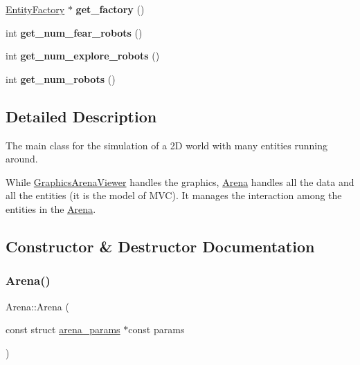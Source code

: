 \begin{DoxyCompactItemize}
\mbox{\label{class_arena_a684050e2bd1c7a6ecb57c38575fec995}} 
\mbox{\hyperlink{class_entity_factory}{Entity\+Factory}} $\ast$ {\bfseries get\+\_\+factory} ()
\item 
\mbox{\label{class_arena_abc2f835afc51723b80fb53310e6c4864}} 
int {\bfseries get\+\_\+num\+\_\+fear\+\_\+robots} ()
\item 
\mbox{\label{class_arena_a8fdca5473b8a8795a241f2a7ade172c2}} 
int {\bfseries get\+\_\+num\+\_\+explore\+\_\+robots} ()
\item 
\mbox{\label{class_arena_a0b6b09dbeb919c2300dc034a39cbe57f}} 
int {\bfseries get\+\_\+num\+\_\+robots} ()
\end{DoxyCompactItemize}


\subsection{Detailed Description}
The main class for the simulation of a 2D world with many entities running around. 

While \mbox{\hyperlink{class_graphics_arena_viewer}{Graphics\+Arena\+Viewer}} handles the graphics, \mbox{\hyperlink{class_arena}{Arena}} handles all the data and all the entities (it is the model of M\+VC). It manages the interaction among the entities in the \mbox{\hyperlink{class_arena}{Arena}}. 

\subsection{Constructor \& Destructor Documentation}
\mbox{\label{class_arena_ac442d519facc5feebfd7612a53817e9a}} 
\subsubsection{\texorpdfstring{Arena()}{Arena()}}
{\footnotesize\ttfamily Arena\+::\+Arena (\begin{DoxyParamCaption}\item[{const struct \mbox{\hyperlink{structarena__params}{arena\+\_\+params}} $\ast$const}]{params }\end{DoxyParamCaption})\hspace{0.3cm}{\ttfamily [explicit]}}



